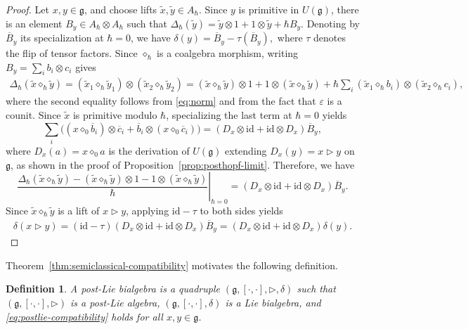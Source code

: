 \documentclass[11pt,english]{article}
\newcommand{\ten}{\otimes}
\newcommand{\id}{\mathrm{id}}
\newcommand{\Del}{\Delta}
\newcommand{\act}{\mathbin{\diamond}}
\newcommand{\tri}{\mathbin{\triangleright}}
\newtheorem{definition}[lemma]{Definition}
\theoremstyle{definition}
\begin{document}
\begin{proof}
Let $x,y\in\mathfrak g$, and choose lifts
$\widetilde x,\widetilde y\in A_\hbar$. Since $y$ is primitive
in $U(\mathfrak g)$, there is an element $B_y\in A_\hbar\ten A_\hbar$ such that $\Del_\hbar(\widetilde y)
=\widetilde y\ten1+1\ten\widetilde y
+\hbar B_y$.
Denoting by $\overline{B}_y$ its specialization
at $\hbar=0$, we have $\delta(y)=\overline{B}_y-\tau(\overline{B}_y),$
where $\tau$ denotes the flip of tensor factors.
Since $\act_\hbar$ is a coalgebra morphism,
writing $B_y=\sum_i b_i\ten c_i$ gives
\[
\begin{aligned}
\Del_\hbar(\widetilde x\act_\hbar\widetilde y)
=(\widetilde x_1\act_\hbar\widetilde y_1)
  \ten(\widetilde x_2\act_\hbar\widetilde y_2)=(\widetilde x\act_\hbar\widetilde y)\ten1
  +1\ten(\widetilde x\act_\hbar\widetilde y)+\hbar\sum_i
  (\widetilde x_1\act_\hbar b_i)
  \ten(\widetilde x_2\act_\hbar c_i),
\end{aligned}
\]
where the second equality follows from \eqref{eq:norm} and from the fact that $\varepsilon$ is a counit.
Since $\widetilde x$ is primitive modulo $\hbar$,
specializing the last term at $\hbar=0$ yields
\[
\sum_i
\bigl((x\act_0\overline b_i)\otimes\overline c_i
+\overline b_i\otimes
 (x\act_0\overline c_i)\bigr)
=(D_x\otimes\id+\id\otimes D_x)\overline B_y,
\]
where $D_x(a)=x\act_0 a$ is the derivation
of $U(\mathfrak g)$ extending
$D_x(y)=x\tri y$ on $\mathfrak g$,
as shown in the proof of
Proposition~\ref{prop:posthopf-limit}.
Therefore, we have
\[
\left.
\frac{
\Del_\hbar(\widetilde x\act_\hbar\widetilde y)
-(\widetilde x\act_\hbar\widetilde y)\ten1
-1\ten(\widetilde x\act_\hbar\widetilde y)}
{\hbar}
\right|_{\hbar=0}
=(D_x\otimes\id+\id\otimes D_x)\overline B_y.
\]
Since $\widetilde x\act_\hbar\widetilde y$
is a lift of $x\tri y$, applying
$\id-\tau$ to both sides yields
\[
\begin{aligned}
\delta(x\tri y)
=(\id-\tau)
  (D_x\otimes\id+\id\otimes D_x)
  \overline B_y
=(D_x\otimes\id+\id\otimes D_x)\delta(y).
\end{aligned}
\]
\end{proof}

Theorem~\ref{thm:semiclassical-compatibility}
motivates the following definition.

\begin{definition}\label{def:postlie-bialgebra}
A \emph{post-Lie bialgebra} is a quadruple
$(\mathfrak g,[\cdot,\cdot],\tri,\delta)$
such that $(\mathfrak g,[\cdot,\cdot],\tri)$
is a post-Lie algebra,
$(\mathfrak g,[\cdot,\cdot],\delta)$
is a Lie bialgebra, and
\eqref{eq:postlie-compatibility} holds
for all $x,y\in\mathfrak g$.
\end{definition}
\end{document}

